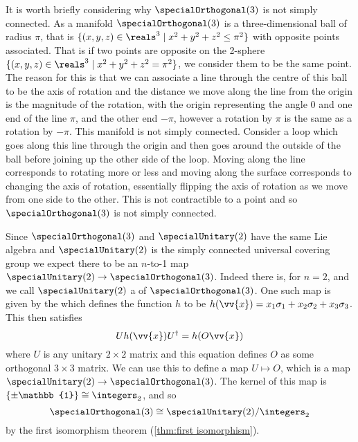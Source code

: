 \documentclass[fleqn]{NotesClass}
\newcommand*{\isomorphic}{\cong}
\newcommand*{\hermit}{\dagger}
\newcommand*{\ident}{\mathbb{1}}
\begin{document}
    It is worth briefly considering why \(\specialOrthogonal(3)\) is not simply connected.
    As a manifold \(\specialOrthogonal(3)\) is a three-dimensional ball of radius \(\pi\), that is \(\{(x, y, z) \in \reals^3 \mid x^2 + y^2 + z^2 \le \pi^2\}\) with opposite points associated.
    That is if two points are opposite on the 2-sphere \(\{(x, y, z) \in \reals^3 \mid x^2 + y^2 + z^2 = \pi^2\}\), we consider them to be the same point.
    The reason for this is that we can associate a line through the centre of this ball to be the axis of rotation and the distance we move along the line from the origin is the magnitude of the rotation, with the origin representing the angle 0 and one end of the line \(\pi\), and the other end \(-\pi\), however a rotation by \(\pi\) is the same as a rotation by \(-\pi\).
    This manifold is not simply connected.
    Consider a loop which goes along this line through the origin and then goes around the outside of the ball before joining up the other side of the loop.
    Moving along the line corresponds to rotating more or less and moving along the surface corresponds to changing the axis of rotation, essentially flipping the axis of rotation as we move from one side to the other.
    This is not contractible to a point and so \(\specialOrthogonal(3)\) is not simply connected.
    
    Since \(\specialOrthogonal(3)\) and \(\specialUnitary(2)\) have the same Lie algebra and \(\specialUnitary(2)\) is the simply connected universal covering group we expect there to be an \(n\)-to-1 map \(\specialUnitary(2) \to \specialOrthogonal(3)\).
    Indeed there is, for \(n = 2\), and we call \(\specialUnitary(2)\) a  of \(\specialOrthogonal(3)\).
    One such map is given by the  which defines the function \(h\) to be \(h(\vv{x}) = x_1\sigma_1 + x_2\sigma_2 + x_3\sigma_3\).
    This then satisfies
    \begin{equation}
        Uh(\vv{x})U^\hermit = h(O\vv{x})
    \end{equation}
    where \(U\) is any unitary \(2\times 2\) matrix and this equation defines \(O\) as some orthogonal \(3\times 3\) matrix.
    We can use this to define a map \(U \mapsto O\), which is a map \(\specialUnitary(2) \to \specialOrthogonal(3)\).
    The kernel of this map is \(\{\pm \ident\} \isomorphic \integers_2\), and so
    \begin{equation}
        \specialOrthogonal(3) \isomorphic \specialUnitary(2) / \integers_2
    \end{equation}
    by the first isomorphism theorem (\cref{thm:first isomorphism}).
    
    \appendixpage
    \begin{appendices}
        
        
        
        
    \end{appendices}
    
    \backmatter
    \renewcommand{\glossaryname}{Acronyms}
    \printglossary[acronym]
    \printindex
\end{document}

